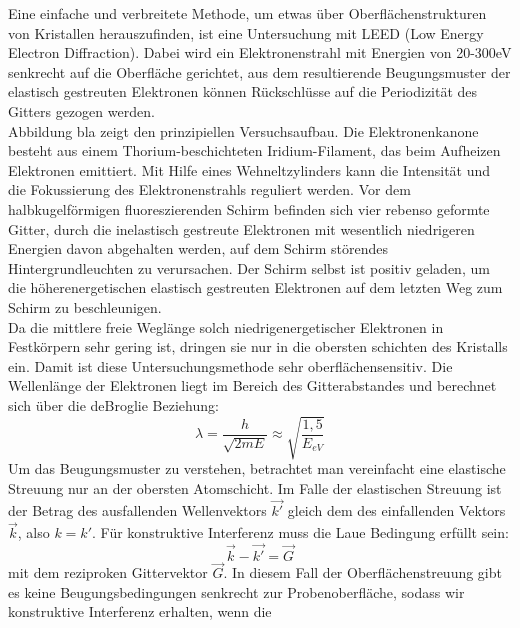 Eine einfache und verbreitete Methode, um etwas über Oberflächenstrukturen von
 Kristallen herauszufinden, ist eine Untersuchung mit LEED (Low Energy Electron
 Diffraction).
 Dabei wird ein Elektronenstrahl mit Energien von 20-300eV senkrecht auf die
 Oberfläche gerichtet, aus dem resultierende Beugungsmuster der elastisch
 gestreuten Elektronen können Rückschlüsse auf die Periodizität des Gitters
 gezogen werden.\\
 Abbildung bla zeigt den prinzipiellen Versuchsaufbau. Die Elektronenkanone
 besteht aus einem Thorium-beschichteten Iridium-Filament, das beim
 Aufheizen Elektronen emittiert. Mit Hilfe eines Wehneltzylinders kann die
 Intensität und die Fokussierung des Elektronenstrahls reguliert werden. Vor dem
 halbkugelförmigen fluoreszierenden Schirm befinden sich vier rebenso geformte
 Gitter, durch die inelastisch gestreute Elektronen mit wesentlich niedrigeren Energien
 davon abgehalten werden, auf dem Schirm störendes Hintergrundleuchten zu
 verursachen. Der Schirm selbst ist positiv geladen, um die höherenergetischen
 elastisch gestreuten Elektronen auf dem letzten Weg zum Schirm zu
 beschleunigen.\\
  Da die mittlere freie Weglänge solch niedrigenergetischer Elektronen in
 Festkörpern sehr gering ist, dringen sie nur in die obersten schichten des
 Kristalls ein. Damit ist diese Untersuchungsmethode sehr oberflächensensitiv.
 Die Wellenlänge der Elektronen liegt im Bereich des Gitterabstandes und
 berechnet sich über die deBroglie Beziehung:
 \[\lambda=\frac{h}{\sqrt{2mE}}\approx \sqrt{\frac{1{,}5}{E_{eV}}}\]
Um das Beugungsmuster zu verstehen, betrachtet man vereinfacht eine elastische
Streuung nur an der obersten Atomschicht. Im Falle der elastischen Streuung ist
der Betrag des ausfallenden Wellenvektors $\vec{k'}$ gleich dem des
einfallenden Vektors $\vec{k}$, also $k=k'$. Für konstruktive Interferenz
muss die Laue Bedingung erfüllt sein:
\[\vec{k}-\vec{k'}=\vec{G}\]
mit dem reziproken Gittervektor $\vec{G}$. 
In diesem Fall der Oberflächenstreuung gibt es keine Beugungsbedingungen
senkrecht zur Probenoberfläche, sodass wir konstruktive Interferenz erhalten,
wenn die 
